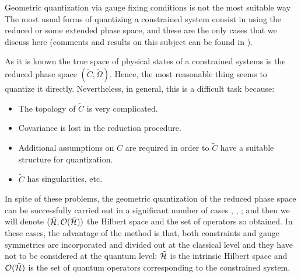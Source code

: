 \documentclass[12pt]{article}
\theoremstyle{plain}
\def\Hr{\tilde{\cal H}}
\def\rps{(\tilde C,\tilde\Omega )}
\begin{document}
Geometric quantization via gauge fixing conditions
is not the most suitable way
The most usual forms of quantizing
a constrained system consist in using the reduced or some extended phase
space,
and these are the only cases that we discuss here
(comments and results on this subject can be found in \cite{Sn-83}).

As it is known the true space of physical states of a constrained
systems
is the reduced phase space $\rps$.
Hence, the most reasonable thing seems to quantize it directly.
Nevertheless, in general, this is a difficult task because:
\begin{itemize}
\item
The topology of $\tilde C$ is very complicated.
\item
Covariance is lost in the reduction procedure.
\item
Additional assumptions on $C$ are required in order to
$\tilde C$ have a suitable structure for quantization.
\item
$\tilde C$ has singularities, etc.
\end{itemize}
In spite of these problems, the geometric quantization
of the reduced phase space can be successfully carried out
in a significant number of cases \cite{AS-86}, \cite{Go-86},
\cite{Va-83};
and then we will denote $(\Hr ,{\cal O}(\Hr ))$
the Hilbert space  and the set of operators so obtained.
In these cases, the advantage of the method is that,
both constraints and gauge symmetries are incorporated
and divided out at the classical level and they
have not to be considered at the quantum level:
$\Hr$ is the intrinsic Hilbert space and ${\cal O}(\Hr )$ is the set of
quantum operators
corresponding to the constrained system.
\end{document}
